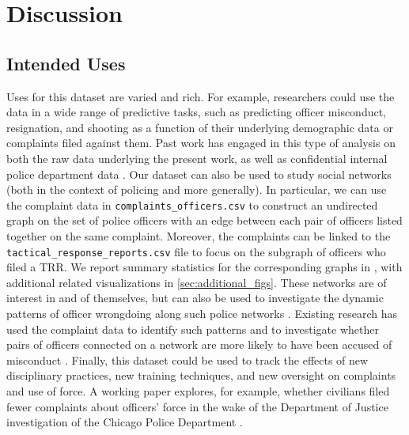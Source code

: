 \section{Discussion} \label{sec:discussion}

\subsection{Intended Uses}
Uses for this dataset are varied and rich. For example, researchers could use
the data in a wide range of predictive tasks, such as predicting officer
misconduct, resignation, and shooting as a function of their underlying
demographic data or complaints filed against them. Past work has engaged in
this type of analysis on both the raw data underlying the present work, as well
as confidential internal police department data \cite{Helsby18,Rozema19}.  Our
dataset can also be used to study social networks (both in the context of
policing and more generally). In particular, we can use the complaint data in
\texttt{complaints\_officers.csv} to construct an undirected graph on the set
of police officers with an edge between each pair of officers listed together
on the same complaint. Moreover, the complaints can be linked to the
\texttt{tactical\_response\_reports.csv} file to focus on the subgraph of
officers who filed a TRR. We report summary statistics for the corresponding
graphs in , with additional related visualizations in
\cref{sec:additional_figs}.  These networks are of interest in and of
themselves, but can also be used to investigate the dynamic patterns of officer
wrongdoing along such police networks \cite{Roithmayr16}. Existing research has
used the complaint data to identify such patterns and to investigate whether
pairs of officers connected on a network are more likely to have been accused
of misconduct \cite{Ouellet19}.  Finally, this dataset could be used to track
the effects of new disciplinary practices, new training techniques, and new
oversight on complaints and use of force. A working paper explores, for
example, whether civilians filed fewer complaints about officers' force in the
wake of the Department of Justice investigation of the Chicago Police
Department \cite{Travers20}. 


